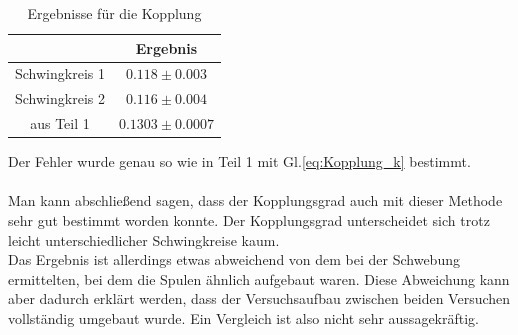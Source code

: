 \documentclass[12pt,a4paper]{article}
\begin{document}
\begin{table}[H]
\begin{center}
\begin{tabular}{|c|c|}
\hline 
 & Ergebnis\\ 
\hline 
Schwingkreis 1  & $0.118\pm 0.003$ \\ 
\hline 
Schwingkreis 2 & $0.116\pm  0.004$\\ 
\hline 
aus Teil 1 & $0.1303\pm  0.0007$\\ 
\hline 
\end{tabular} 
\end{center}
\label{tab:Ergebnisse_k}
\caption{Ergebnisse für die Kopplung}
\end{table}

Der Fehler wurde genau so wie in Teil 1 mit Gl.\ref{eq:Kopplung_k} bestimmt.\\
\\
Man kann abschließend sagen, dass der Kopplungsgrad auch mit dieser Methode sehr gut bestimmt worden konnte. Der Kopplungsgrad unterscheidet sich trotz leicht unterschiedlicher Schwingkreise kaum.\\
Das Ergebnis ist allerdings etwas abweichend von dem bei der Schwebung ermittelten, bei dem die Spulen ähnlich aufgebaut waren. Diese Abweichung kann aber dadurch erklärt werden, dass der Versuchsaufbau zwischen beiden Versuchen vollständig umgebaut wurde. Ein Vergleich ist also nicht sehr aussagekräftig.
\end{document}

